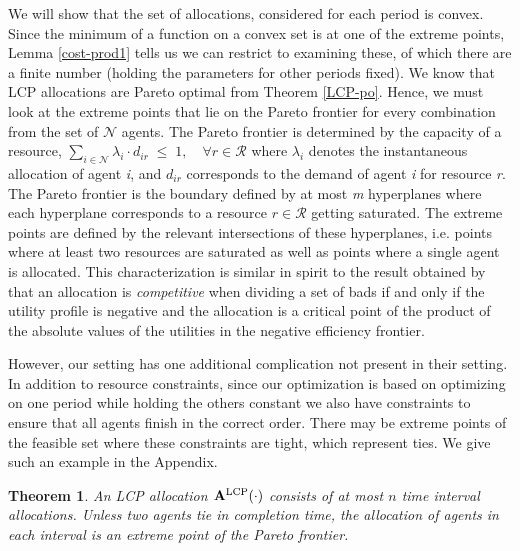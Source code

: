 \documentclass[letterpaper]{article} %
\newtheorem{theorem}{Theorem}
\theoremstyle{definition}
\begin{document}
We will show that the set of allocations, considered for each period is convex. Since the minimum of a function on a convex set is at one of the extreme points, Lemma \ref{cost-prod1} tells us we can restrict to examining these, of which there are a finite number (holding the parameters for other periods fixed).
We know that LCP allocations are Pareto optimal from Theorem \ref{LCP-po}. Hence, we must look at the extreme points that lie on the Pareto frontier for every combination from the set of $\mathcal{N}$ agents. The Pareto frontier is determined by the capacity of a resource, $ \sum_{i \in \mathcal{N}} \lambda_{i} \cdot d_{ir} \; \leq \; 1, \quad \forall r \in \mathcal{R}$
where $\lambda_{i}$ denotes the instantaneous allocation of agent \textit{i}, and $d_{ir}$ corresponds to the demand of agent \textit{i} for resource \textit{r}. The Pareto frontier is the boundary defined by at most \textit{m} hyperplanes where each hyperplane corresponds to a resource $r \in \mathcal{R}$ getting saturated. The extreme points are defined by the relevant intersections of these hyperplanes, i.e. points where at least two resources are saturated as well as points where a single agent is allocated. This characterization is similar in spirit to the result obtained by \citeauthor{bogomolnaia2017competitive}  that an allocation is \textit{competitive} when dividing a set of bads if and only if the utility profile is negative and the allocation is a critical point of the product of the absolute values of the utilities in the negative efficiency frontier. 

However, our setting has one additional complication not present in their setting.  In addition to resource constraints, since our optimization is based on optimizing on one period while holding the others constant we also have constraints to ensure that all agents finish in the correct order. There may be extreme points of the feasible set where these constraints are tight, which represent ties. We give such an example in the Appendix.

\begin{theorem} \label{cost-prodLCP}
An LCP allocation $\mathbf{A}^{\textnormal{LCP}}(\cdot)$ consists of at most $n$ time interval allocations.  Unless two agents tie in completion time, the allocation of agents in each interval is an extreme point of the Pareto frontier.
\end{theorem}
\end{document}
